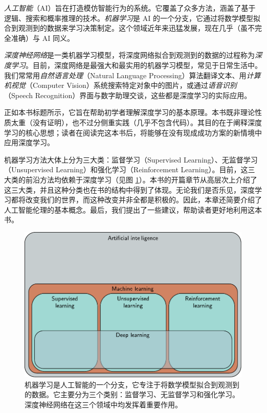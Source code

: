\documentclass[lang=cn,newtx,10pt,scheme=chinese]{elegantbook}
\begin{document}
\textit{人工智能}（AI）旨在打造模仿智能行为的系统。它覆盖了众多方法，涵盖了基于逻辑、搜索和概率推理的技术。\textit{机器学习}是 AI 的一个分支，它通过将数学模型拟合到观测到的数据来学习决策制定。这个领域近年来迅猛发展，现在几乎（虽不完全准确）与 AI 同义。

\textit{深度神经网络}是一类机器学习模型，将深度网络拟合到观测到的数据的过程称为\textit{深度学习}。目前，深度网络是最强大和最实用的机器学习模型，常见于日常生活中。我们常常用\textit{自然语言处理}（Natural Language Processing）算法翻译文本、用\textit{计算机视觉}（Computer Vision）系统搜索特定对象中的图片，或通过\textit{语音识别}（Speech Recognition）界面与数字助理交谈，这些都是深度学习的实际应用。

正如本书标题所示，它旨在帮助初学者理解深度学习的基本原理。本书既非理论性质太重（没有证明），也不过分侧重实践（几乎不包含代码）。其目的在于阐释深度学习的核心思想；读者在阅读完这本书后，将能够在没有现成成功方案的新情境中应用深度学习。

机器学习方法大体上分为三大类：监督学习（Supervised Learning）、无监督学习（Unsupervised Learning）和强化学习（Reinforcement Learning）。目前，这三大类的前沿方法均依赖于深度学习（见图 \ref{IntroOverview}）。本书的开篇章节从高层次上介绍了这三大类，并且这种分类也在书的结构中得到了体现。无论我们是否乐见，深度学习都将改变我们的世界，而这种改变并非全都是积极的。因此，本章还简要介绍了人工智能伦理的基本概念。最后，我们提出了一些建议，帮助读者更好地利用这本书。

\begin{figure}[ht!]
	\centering
	\includegraphics[width=\linewidth]{PDFFigures/UDLChap1PDF/IntroOverview.pdf}
	\caption{机器学习是人工智能的一个分支，它专注于将数学模型拟合到观测到的数据。它主要分为三个类别：监督学习、无监督学习和强化学习。深度神经网络在这三个领域中均发挥着重要作用。}
    \label{IntroOverview}
\end{figure}
\end{document}
